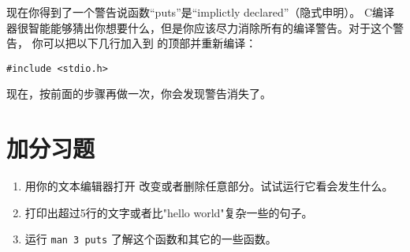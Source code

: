 现在你得到了一个警告说函数“puts”是“implictly declared”（隐式申明）。
C编译器很智能能够猜出你想要什么，但是你应该尽力消除所有的编译警告。对于这个警告，
你可以把以下几行加入到  的顶部并重新编译：

\begin{lstlisting}
#include <stdio.h>
\end{lstlisting}

现在，按前面的步骤再做一次，你会发现警告消失了。

\section{加分习题}

\begin{enumerate}
\item 用你的文本编辑器打开  改变或者删除任意部分。试试运行它看会发生什么。
\item 打印出超过5行的文字或者比"hello world"复杂一些的句子。
\item 运行 \verb|man 3 puts| 了解这个函数和其它的一些函数。
\end{enumerate}


